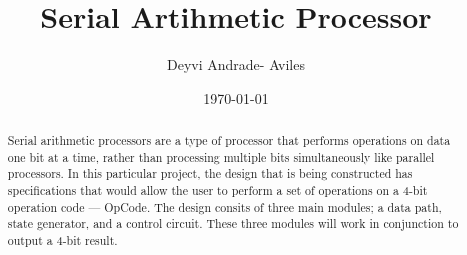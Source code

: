 \documentclass[11pt,a4paper,english]{article}
\author{Deyvi Andrade- Aviles}
\date{\today}
\begin{document}
\providecommand{\ShortAuthorList}[0]{A.~M.~Surname, B.~D.~Suffix Jr., C.~G. Suffix III} %
\title{Serial Artihmetic Processor}

\date{}
\begin{abstract}
\noindent
Serial arithmetic processors are a type of processor that performs operations on data one bit at a time, rather than processing multiple bits simultaneously like parallel processors. In this particular project, the design that is being constructed has specifications that would allow the user to perform a set of operations on a 4-bit operation code --- OpCode. The design consits of three main modules; a data path, state generator, and a control circuit. These three modules will work in conjunction to output a 4-bit result.


\DOI{} %
\end{abstract}

\maketitle
\thispagestyle{titlestyle}

\pagebreak

\end{document}
